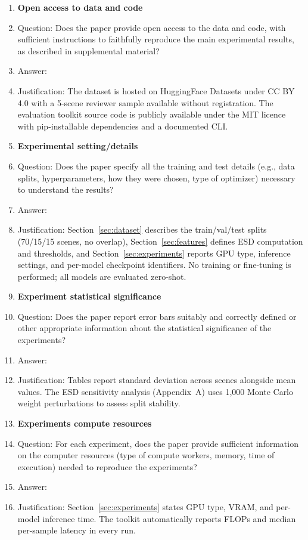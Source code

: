 \begin{enumerate}
\item {\bf Open access to data and code}
    \item[] Question: Does the paper provide open access to the data and code, with sufficient instructions to faithfully reproduce the main experimental results, as described in supplemental material?
    \item[] Answer: \answerYes{}
    \item[] Justification: The dataset is hosted on HuggingFace Datasets under CC BY 4.0 with a 5-scene reviewer sample available without registration. The evaluation toolkit source code is publicly available under the MIT licence with pip-installable dependencies and a documented CLI.

\item {\bf Experimental setting/details}
    \item[] Question: Does the paper specify all the training and test details (e.g., data splits, hyperparameters, how they were chosen, type of optimizer) necessary to understand the results?
    \item[] Answer: \answerYes{}
    \item[] Justification: Section~\ref{sec:dataset} describes the train/val/test splits (70/15/15 scenes, no overlap), Section~\ref{sec:features} defines ESD computation and thresholds, and Section~\ref{sec:experiments} reports GPU type, inference settings, and per-model checkpoint identifiers. No training or fine-tuning is performed; all models are evaluated zero-shot.

\item {\bf Experiment statistical significance}
    \item[] Question: Does the paper report error bars suitably and correctly defined or other appropriate information about the statistical significance of the experiments?
    \item[] Answer: \answerYes{}
    \item[] Justification: Tables report standard deviation across scenes alongside mean values. The ESD sensitivity analysis (Appendix~A) uses 1{,}000 Monte Carlo weight perturbations to assess split stability.

\item {\bf Experiments compute resources}
    \item[] Question: For each experiment, does the paper provide sufficient information on the computer resources (type of compute workers, memory, time of execution) needed to reproduce the experiments?
    \item[] Answer: \answerYes{}
    \item[] Justification: Section~\ref{sec:experiments} states GPU type, VRAM, and per-model inference time. The toolkit automatically reports FLOPs and median per-sample latency in every run.


\end{enumerate}
